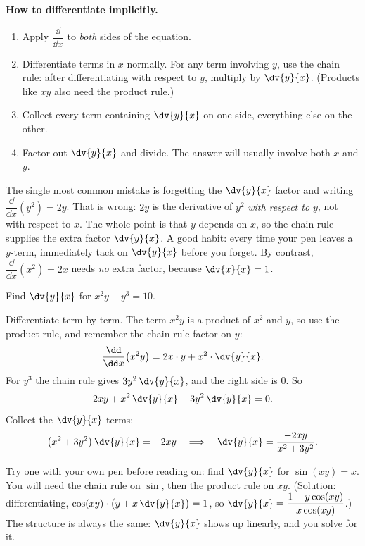 \begin{focusbox}
\textbf{How to differentiate implicitly.}
\begin{enumerate}
\item Apply $\dfrac{\dd}{\dd x}$ to \emph{both} sides of the equation.
\item Differentiate terms in $x$ normally. For any term involving $y$, use the chain rule: after
differentiating with respect to $y$, multiply by $\dv{y}{x}$. (Products like $xy$ also need the
product rule.)
\item Collect every term containing $\dv{y}{x}$ on one side, everything else on the other.
\item Factor out $\dv{y}{x}$ and divide. The answer will usually involve both $x$ and $y$.
\end{enumerate}
\end{focusbox}

\begin{trapbox}
The single most common mistake is forgetting the $\dv{y}{x}$ factor and writing
$\dfrac{\dd}{\dd x}(y^2) = 2y$. That is wrong: $2y$ is the derivative of $y^2$ \emph{with respect to
$y$}, not with respect to $x$. The whole point is that $y$ depends on $x$, so the chain rule supplies
the extra factor $\dv{y}{x}$. A good habit: every time your pen leaves a $y$-term, immediately tack
on $\dv{y}{x}$ before you forget. By contrast, $\dfrac{\dd}{\dd x}(x^2)=2x$ needs \emph{no} extra
factor, because $\dv{x}{x}=1$.
\end{trapbox}

\begin{example}
\label{ch13:ex-product}
Find $\dv{y}{x}$ for $x^2 y + y^3 = 10$.

Differentiate term by term. The term $x^2 y$ is a product of $x^2$ and $y$, so use the product rule,
and remember the chain-rule factor on $y$:
\[
\frac{\dd}{\dd x}\!\left(x^2 y\right) = 2x\cdot y + x^2\cdot \dv{y}{x}.
\]
For $y^3$ the chain rule gives $3y^2\,\dv{y}{x}$, and the right side is $0$. So
\[
2xy + x^2\,\dv{y}{x} + 3y^2\,\dv{y}{x} = 0.
\]
Collect the $\dv{y}{x}$ terms:
\[
\left(x^2 + 3y^2\right)\dv{y}{x} = -2xy
\quad\Longrightarrow\quad
\dv{y}{x} = \frac{-2xy}{x^2 + 3y^2}.
\]
\end{example}

\begin{labbox}
Try one with your own pen before reading on: find $\dv{y}{x}$ for $\sin(xy) = x$. You will need the
chain rule on $\sin$, then the product rule on $xy$. (Solution: differentiating,
$\cos(xy)\cdot\big(y + x\,\dv{y}{x}\big) = 1$, so
$\dv{y}{x} = \dfrac{1 - y\cos(xy)}{x\cos(xy)}$.) The structure is always the same: $\dv{y}{x}$ shows
up linearly, and you solve for it.
\end{labbox}

